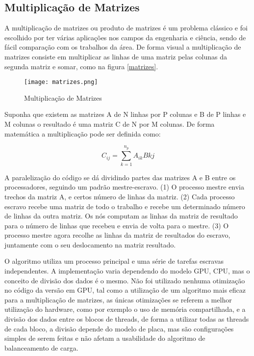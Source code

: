 \subsection{Multiplicação de Matrizes}

A multiplicação de matrizes ou produto de matrizes é um problema clássico e foi escolhido por ter várias aplicações nos campos da engenharia e ciência, sendo de fácil comparação com os trabalhos da área. De forma visual a multiplicação de matrizes consiste em multiplicar as linhas de uma matriz pelas colunas da segunda matriz e somar, como na figura \ref{matrizes}.

\begin{figure}[htb]
	\begin{center}
	\centering
			\texttt{[image: matrizes.png]}
	\label{fig: matrizes}
	\caption{Multiplicação de Matrizes}
	\end{center}
\end{figure}

Suponha que existem as matrizes A de N linhas por P colunas e B de P linhas e M colunas o resultado é uma matriz C de N por M colunas. De forma matemática a multiplicação pode ser definida como:

\begin{equation} C_{ij} = \sum_{k=1}^{n_p} A_{ik}B{kj}
 \label{eq:black}
\end{equation}

A paralelização do código se dá dividindo partes das matrizes A e B entre os processadores, seguindo um padrão mestre-escravo. (1) O processo mestre envia trechos da matriz A, e certos número de linhas da matriz.
(2) Cada processo escravo recebe uma matriz de todo o trabalho e recebe um determinado número de linhas da outra matriz. Os nós computam as linhas da matriz de resultado para o número de linhas que recebeu e envia de volta para o mestre. 
(3) O processo mestre agora recolhe as linhas da matriz de resultados do escravo, juntamente com o seu deslocamento na matriz resultado. 

O algoritmo utiliza um processo principal e uma série de tarefas escravas independentes. A implementação varia dependendo do modelo GPU, CPU, mas o conceito de divisão dos dados é o mesmo. Não foi utilizado nenhuma otimização no código da versão em GPU, tal como a utilização de um algoritmo mais eficaz para a multiplicação de matrizes, as únicas otimizações se referem a melhor utilização do hardware, como por exemplo o uso de memória compartilhada, e a divisão dos dados entre os blocos de threads, de forma a utilizar todas as threads de cada bloco, a divisão depende do modelo de placa, mas são configurações simples de serem feitas e não afetam a usabilidade do algoritmo de balanceamento de carga. 

